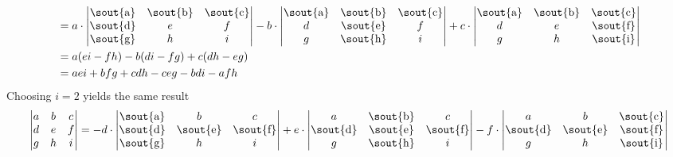 \begin{itemize}
\begin{align*}
      &=
      a \cdot \begin{vmatrix}
        \text{\sout{a}} & \text{\sout{b}} & \text{\sout{c}}\\
        \text{\sout{d}} & e & f\\
        \text{\sout{g}} & h & i
      \end{vmatrix}
      - b \cdot \begin{vmatrix}
        \text{\sout{a}} & \text{\sout{b}} & \text{\sout{c}}\\
        d & \text{\sout{e}} & f\\
        g & \text{\sout{h}} & i
      \end{vmatrix}
      + c \cdot \begin{vmatrix}
        \text{\sout{a}} & \text{\sout{b}} & \text{\sout{c}}\\
        d & e & \text{\sout{f}}\\
        g & h & \text{\sout{i}}
      \end{vmatrix}\\
      &= a(ei - fh) - b(di - fg) + c(dh - eg)\\
      &= aei + bfg + cdh - ceg - bdi - afh
    \end{align*}
    Choosing $i = 2$ yields the same result
    \begin{align*}
      \begin{vmatrix}
        a & b & c\\
        d & e & f\\
        g & h & i
      \end{vmatrix}
      &=
      - d \cdot \begin{vmatrix}
        \text{\sout{a}} & b & c\\
        \text{\sout{d}} & \text{\sout{e}} & \text{\sout{f}}\\
        \text{\sout{g}} & h & i
      \end{vmatrix}
      + e \cdot \begin{vmatrix}
        a & \text{\sout{b}} & c\\
        \text{\sout{d}} & \text{\sout{e}} & \text{\sout{f}}\\
        g & \text{\sout{h}} & i
      \end{vmatrix}
      - f \cdot \begin{vmatrix}
        a & b & \text{\sout{c}}\\
        \text{\sout{d}} & \text{\sout{e}} & \text{\sout{f}}\\
        g & h & \text{\sout{i}}
      \end{vmatrix}\\

\end{align*}
\end{itemize}
